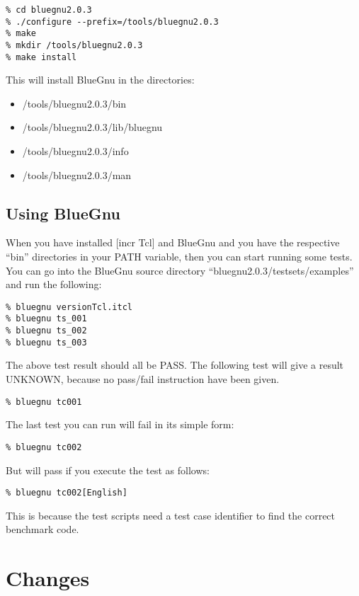 \begin{verbatim}
% cd bluegnu2.0.3
% ./configure --prefix=/tools/bluegnu2.0.3
% make
% mkdir /tools/bluegnu2.0.3
% make install
\end{verbatim}

This will install BlueGnu in the directories:
\begin{itemize}
\item /tools/bluegnu2.0.3/bin
\item /tools/bluegnu2.0.3/lib/bluegnu
\item /tools/bluegnu2.0.3/info
\item /tools/bluegnu2.0.3/man
\end{itemize}

\subsection{Using BlueGnu}
When you have installed [incr Tcl] and BlueGnu and you have the
respective ``bin'' directories in your PATH variable, then you can
start running some tests. You can go into the BlueGnu source directory
``bluegnu2.0.3/testsets/examples'' and run the following:

\begin{verbatim}
% bluegnu versionTcl.itcl
% bluegnu ts_001
% bluegnu ts_002
% bluegnu ts_003
\end{verbatim}

The above test result should all be PASS. The following test will give
a result UNKNOWN, because no pass/fail instruction have been given.

\begin{verbatim}
% bluegnu tc001
\end{verbatim}

The last test you can run will fail in its simple form:

\begin{verbatim}
% bluegnu tc002
\end{verbatim}

But will pass if you execute the test as follows:

\begin{verbatim}
% bluegnu tc002[English]
\end{verbatim}

This is because the test scripts need a test case identifier to find
the correct benchmark code.

\section{Changes}
